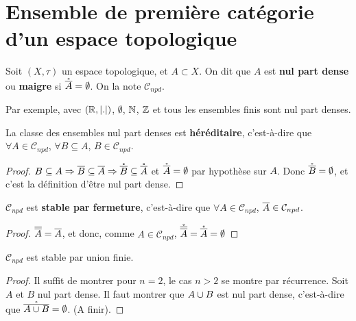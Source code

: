 \chapter{Ensemble de première catégorie d'un espace topologique}

\begin{definition}
	Soit $(X, \tau)$ un espace topologique, et $A \subset X$. On dit que $A$ est
	\textbf{nul part dense} ou \textbf{maigre} si $\mathring{\overline{A}} =
	\emptyset$. On la note $\mathcal{C}_{npd}$.
\end{definition}

Par exemple, avec $(\mathbb{R}, |.|)$, $\emptyset$, $\mathbb{N}$, $\mathbb{Z}$ et tous
les ensembles finis sont nul part denses.

\begin{proposition}
	La classe des ensembles nul part denses est \textbf{héréditaire},
	c'est-à-dire que $\forall A \in \mathcal{C}_{npd}$, $\forall B \subseteq A$,
	$B \in \mathcal{C}_{npd}$.
\end{proposition}

\begin{proof}
	$B \subseteq A \Rightarrow \overline{B} \subseteq \overline{A} \Rightarrow
	\mathring{\overline{B}} \subseteq \mathring{\overline{A}}$ et $\mathring{\overline{A}}= \emptyset$ par
	hypothèse sur $A$. Donc $\mathring{\overline{B}} = \emptyset$, et c'est la définition
	d'être nul part dense.
\end{proof}

\begin{proposition}
	$\mathcal{C}_{npd}$ est \textbf{stable par fermeture}, c'est-à-dire que
	$\forall A \in \mathcal{C}_{npd}$, $\overline{A} \in \mathcal{C}_{npd}$.
\end{proposition}

\begin{proof}
	$\overline{\overline{A}} = \overline{A}$, et donc, comme $A \in \mathcal{C}_{npd}$,
	$\mathring{\overline{\overline{A}}} = \mathring{\overline{A}} = \emptyset$
\end{proof}

\begin{proposition}
	$\mathcal{C}_{npd}$ est stable par union finie.
\end{proposition}

\begin{proof}
	Il suffit de montrer pour $n = 2$, le cas $n > 2$ se montre par récurrence.
	Soit $A$ et $B$ nul part dense. Il faut montrer que $A \cup B$ est nul
	part dense, c'est-à-dire que $\mathring{\overline{A \cup B}} = \emptyset$. (A
	finir).
\end{proof}

